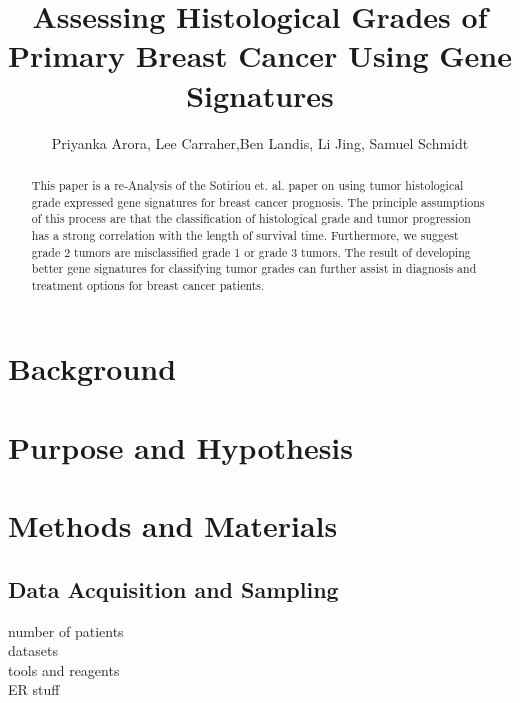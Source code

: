 \documentclass[a4paper,10pt]{article}
\title{Assessing Histological Grades of Primary Breast Cancer Using Gene Signatures}
\author{Priyanka Arora, Lee Carraher,Ben Landis, Li Jing, Samuel Schmidt}
\begin{document}
\maketitle

\begin{abstract}
This paper is a re-Analysis of the Sotiriou et. al. paper on using tumor 
histological grade expressed gene signatures for breast cancer 
prognosis\cite{Sotiriou}. The principle assumptions of this process are that
the classification of histological grade and tumor progression has a strong 
correlation with the length of survival time. Furthermore, we suggest grade 2
tumors are misclassified grade 1 or grade 3 tumors. The result of developing 
better gene signatures for classifying tumor grades can further
assist in diagnosis and treatment options for breast cancer patients.


\end{abstract}

\section{Background}
\section{Purpose and Hypothesis}
\section{Methods and Materials}
\subsection{Data Acquisition and Sampling}
number of patients\\
datasets\\
tools and reagents\\
ER stuff\\
\end{document}
